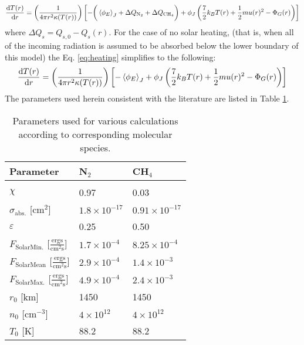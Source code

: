 \documentclass[times,12]{article}
\begin{document}
\begin{align}
\dv{T(r)}{r} = \left( \frac{1}{4 \pi r^2 \kappa(T(r))} \right) \left[ - \bigg( \left\langle \phi_E \right\rangle_{J}  + \Delta Q_{\mathrm{N}_2} + \Delta Q_{\mathrm{CH}_4} \bigg) + \phi_J \left( \frac{7}{2} k_B T(r) + \frac{1}{2}m u(r)^2 - \Phi_G(r) \right) \right]
\label{eq:heating}
\end{align}
\noindent where $\Delta Q_s = Q_{s,0} - Q_s(r)$. For the case of no solar heating, (that is, when all of the incoming radiation is assumed to be absorbed below the lower boundary of this model) the Eq. \ref{eq:heating} simplifies to the following: 
\begin{align}
\dv{T(r)}{r} = \left( \frac{1}{4 \pi r^2 \kappa(T(r))} \right) \left[ - \left\langle \phi_E \right\rangle_{J} + \phi_J \left( \frac{7}{2} k_B T(r) + \frac{1}{2}m u(r)^2 - \Phi_G(r) \right) \right]
\label{eq:noheating}
\end{align}
\noindent The parameters used herein consistent with the literature are listed in Table \ref{tab:parameters}.
\begin{table}[h!]
\centering
\caption{Parameters used for various calculations according to corresponding molecular species.}
\begin{tabular}{lll}
\hline
Parameter & N$_2$ & CH$_4$ \\
\hline
\vspace{-0.1 in} \\
\vspace{0.05in} $\chi$ \citep{Strobel2008} & 0.97 & 0.03\\
\vspace{0.05in} $\sigma_{\mathrm{abs.}}$ [cm$^2$] \citep{Krasnopolsky1999} 	& $1.8 \times 10^{-17}$ & $0.91 \times 10^{-17}$	\\
\vspace{0.05in} $\varepsilon$ \citep{Krasnopolsky1999} & 0.25 & 0.50\\
\vspace{0.05in}$F_{\mathrm{Solar Min.}}$ [$\frac{\mathrm{ergs}}{\mathrm{cm}^2 \mathrm{s}}$] \citep{Krasnopolsky1999} & $1.7 \times 10^{-4}$ & $8.25 \times 10^{-4}$ \\
\vspace{0.05in}$F_{\mathrm{Solar Mean}}$ [$\frac{\mathrm{ergs}}{\mathrm{cm}^2 \mathrm{s}}$] \citep{Krasnopolsky1999} & $2.9 \times 10^{-4}$ & $1.4 \times 10^{-3}$\\
\vspace{0.05in}$F_{\mathrm{Solar Max.}}$ [$\frac{\mathrm{ergs}}{\mathrm{cm}^2 \mathrm{s}}$] \citep{Krasnopolsky1999} & $4.9 \times 10^{-4}$ & $2.4 \times 10^{-3}$\\
\vspace{0.05in}$r_0$ [km] \citep{Tucker2012} & 1450 & 1450\\
\vspace{0.05in}$n_0$ [cm$^{-3}$] \citep{Tucker2012} & $4 \times 10^{12}$ & $4 \times 10^{12}$\\
\vspace{0.05in}$T_0$ [K] \citep{Tucker2012} & 88.2 & 88.2\\
\hline
\end{tabular}
\label{tab:parameters}
\end{table}\\
\end{document}
